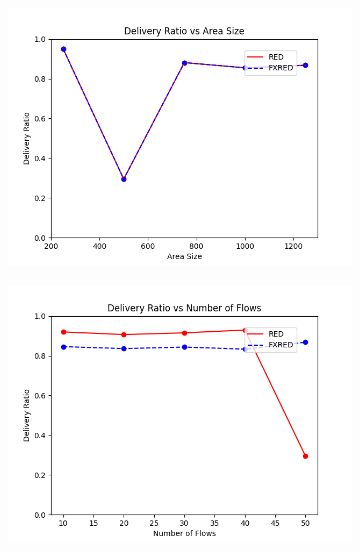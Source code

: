 \documentclass[10pt]{report}
\begin{document}
\begin{figure}
    \centering
    \begin{subfigure}{.5\textwidth}
        \includegraphics[width=1\linewidth]{static/graphs/wireless/Delivery Ratio vs Area Size.png}
    \end{subfigure}%
    \begin{subfigure}{.5\textwidth}
        \includegraphics[width=1\linewidth]{static/graphs/wireless/Delivery Ratio vs Number of Flows.png}
    \end{subfigure}
    \begin{subfigure}{.5\textwidth}

\end{subfigure}
\end{figure}
\end{document}
